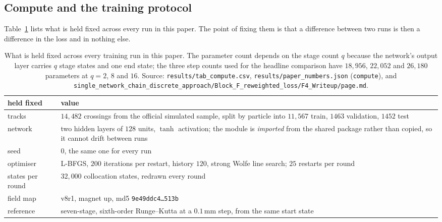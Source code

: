 \documentclass[11pt,a4paper]{article}
\newcommand{\mm}{\ensuremath{\,\mathrm{mm}}}
\begin{document}
\subsection{Compute and the training protocol}
\label{sec:data-compute}

Table~\ref{tab:fixed} lists what is held fixed across every run in this paper.
The point of fixing them is that a difference between two runs is then a
difference in the loss and in nothing else.

\begin{table}[tbp]
  \centering
  \caption{What is held fixed across every training run in this paper. The
  parameter count depends on the stage count $q$ because the network's output
  layer carries $q$ stage states and one end state; the three step counts used
  for the headline comparison have $18{,}956$, $22{,}052$ and $26{,}180$
  parameters at $q = 2$, $8$ and $16$.
  Source: \texttt{results/tab\_compute.csv}, \texttt{results/paper\_numbers.json}
  (\texttt{compute}), and
  \texttt{single\_network\_chain\_discrete\_approach/}\allowbreak\texttt{Block\_F\_reweighted\_loss/F4\_Writeup/page.md}.}
  \label{tab:fixed}
  \small
  \setlength{\tabcolsep}{5pt}
  \begin{tabular}{lp{9.4cm}}
    \toprule
    held fixed & value \\
    \midrule
    tracks & $14{,}482$ crossings from the official simulated sample, split by
      particle into $11{,}567$ train, $1463$ validation, $1452$ test \\
    network & two hidden layers of $128$ units, $\tanh$ activation; the module is
      \emph{imported} from the shared package rather than copied, so it cannot
      drift between runs \\
    seed & $0$, the same one for every run \\
    optimiser & L-BFGS, $200$ iterations per restart, history $120$, strong
      Wolfe line search; $25$ restarts per round \\
    states per round & $32{,}000$ collocation states, redrawn every round \\
    field map & v8r1, magnet up, md5 \texttt{9e49ddc4\dots513b} \\
    reference & seven-stage, sixth-order Runge--Kutta at a $0.1\mm$ step, from
      the same start state \\
    \bottomrule
  \end{tabular}
\end{table}
\end{document}
